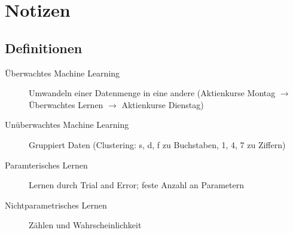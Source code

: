 \documentclass[a4paper,12pt,headings=small,ngerman,bibliography=totoc]{scrartcl}
\begin{document}
\section{Notizen}

\subsection{Definitionen \cite{Trask}}

\begin{description}
	\item[Überwachtes Machine Learning] Umwandeln einer Datenmenge in eine andere (Aktienkurse Montag $\rightarrow$ Überwachtes Lernen $\rightarrow$ Aktienkurse Dienstag)
	\item[Unüberwachtes Machine Learning] Gruppiert Daten (Clustering: s, d, f zu Buchstaben, 1, 4, 7 zu Ziffern)
	\item[Paramterisches Lernen] Lernen durch Trial and Error; feste Anzahl an Parametern
	\item[Nichtparametrisches Lernen] Zählen und Wahrscheinlichkeit
\end{description}





\newpage

\printbibliography[title={Literaturverzeichnis}]
\end{document}
